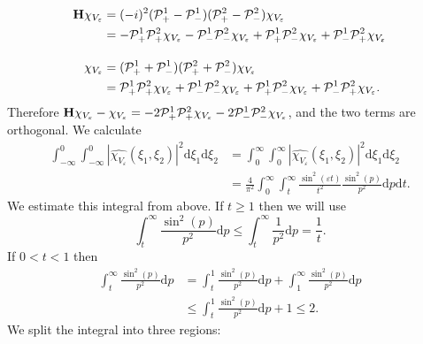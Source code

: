 \documentclass{article}
\newcommand{\mathd}{\mathrm{d}}
\def\H{{\bf H}}
\begin{document}
	\begin{align*}
		\H \chi_{V_{\varepsilon}}
		& =  (- i)^2 (\mathcal P^1_+ -\mathcal P^1_-) (\mathcal P^2_+ - \mathcal P^2_-) \chi_{V_{\varepsilon}}\\
		& = - \mathcal P^1_+ \mathcal P^2_+
		\chi_{V_{\varepsilon}} - \mathcal P^1_- \mathcal P^2_- \chi_{V_{\varepsilon}} + \mathcal P^1_+ \mathcal P^2_-
		\chi_{V_{\varepsilon}} + \mathcal P^1_- \mathcal P^2_+ \chi_{V_{\varepsilon}} \\[1em]
		\chi_{V_{\varepsilon}}
		& =  (\mathcal P^1_+ + \mathcal P^1_-) (\mathcal P^2_+ + \mathcal P^2_-)\chi_{V_{\varepsilon}}\\
		& = \mathcal P^1_+ \mathcal P^2_+ \chi_{V_{\varepsilon}} + \mathcal P^1_- \mathcal P^2_-
		\chi_{V_{\varepsilon}} + \mathcal P^1_+ \mathcal P^2_- \chi_{V_{\varepsilon}} + \mathcal P^1_- \mathcal P^2_+
		\chi_{V_{\varepsilon}} .
	\end{align*}
	Therefore $\H \chi_{V_{\varepsilon}} -
	\chi_{V_{\varepsilon}} = - 2 \mathcal P^1_+ \mathcal P^2_+ \chi_{V_{\varepsilon}} - 2 \mathcal P^1_-
	\mathcal P^2_- \chi_{V_{\varepsilon}}$, and the two terms are orthogonal. We calculate
	\begin{align*}
		\int^0_{- \infty} \int^0_{- \infty} \left| \widehat{\chi_{V_{\varepsilon}}}
		(\xi_1, \xi_2) \right|^2 \mathd \xi_1 \mathd \xi_2
		&= \int^{\infty}_0
		\int^{\infty}_0 \left| \widehat{\chi_{V_{\varepsilon}}} (\xi_1, \xi_2)
		\right|^2 \mathd \xi_1 \mathd \xi_2 \\
		& =  \frac{4}{\pi^2} \int^{\infty}_0
		\int^{\infty}_t \frac{\sin^2 (\varepsilon t)}{t^2} \frac{\sin^2 (p)}{p^2}
		\mathd p \mathd t.
	\end{align*}
	We estimate this integral from above. If $t \geqslant 1$ then we will use
	\[ \int^{\infty}_t \frac{\sin^2 (p)}{p^2} \mathd p \leqslant \int^{\infty}_t
	\frac{1}{p^2} \mathd p = \frac{1}{t} . \]
	If $0 < t < 1$ then
	\begin{align*}
		\int^{\infty}_t \frac{\sin^2 (p)}{p^2} \mathd p
		&= \int^1_t \frac{\sin^2(p)}{p^2} \mathd p + \int^{\infty}_1 \frac{\sin^2 (p)}{p^2} \mathd p \\
		&\leqslant\int^1_t \frac{\sin^2 (p)}{p^2} \mathd p + 1 \leqslant 2 .
	\end{align*}
	We split the integral into three regions:
\end{document}
